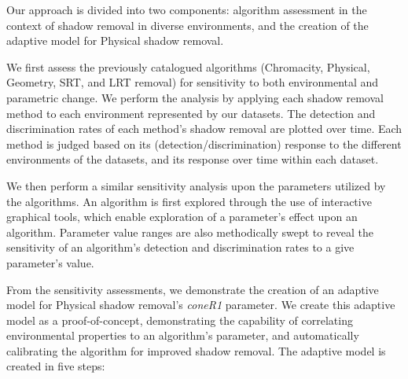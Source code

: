 Our approach is divided into two components: algorithm assessment in the context of shadow removal in diverse environments, and the creation of the adaptive model for Physical shadow removal.

We first assess the previously catalogued algorithms (Chromacity, Physical, Geometry, SRT, and LRT removal) for sensitivity to both environmental and parametric change. We perform the analysis by applying each shadow removal method to each  environment represented by our datasets. The detection and discrimination rates of each method's shadow removal are plotted over time. Each method is judged based on its (detection/discrimination) response to the different environments of the datasets, and its response over time within each dataset.

We then perform a similar sensitivity analysis upon the parameters utilized by the algorithms. An algorithm is first explored through the use of 
interactive graphical tools, which enable exploration of a parameter's 
effect upon an algorithm.  Parameter value ranges are also methodically 
swept to reveal the sensitivity of an algorithm's detection and 
discrimination rates to a give parameter's value.

From the sensitivity assessments, we demonstrate the creation of an adaptive model for Physical shadow removal's \textit{coneR1} parameter. We create this adaptive model as a proof-of-concept, demonstrating the capability of correlating environmental properties to an algorithm's parameter, and automatically calibrating the algorithm for improved shadow removal. The adaptive model is created in five steps:


